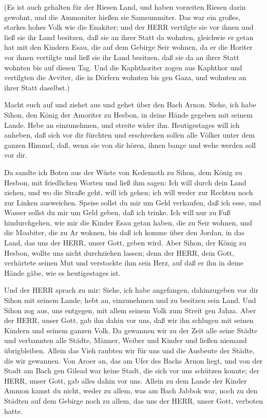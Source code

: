  (Es ist auch gehalten für der Riesen Land, und haben
vorzeiten Riesen darin gewohnt, und die Ammoniter hießen sie
Samsummiter.  Das war ein großes, starkes hohes Volk wie
die Enakiter; und der HERR vertilgte sie vor ihnen und ließ sie ihr Land
besitzen, daß sie an ihrer Statt da wohnten,  gleichwie er
getan hat mit den Kindern Esau, die auf dem Gebirge Seir wohnen, da er
die Horiter vor ihnen vertilgte und ließ sie ihr Land besitzen, daß sie
da an ihrer Statt wohnten bis auf diesen Tag.  Und die
Kaphthoriter zogen aus Kaphthor und vertilgten die Avviter, die in
Dörfern wohnten bis gen Gaza, und wohnten an ihrer Statt daselbst.)

 Macht euch auf und ziehet aus und gehet über den Bach
Arnon. Siehe, ich habe Sihon, den König der Amoriter zu Hesbon, in deine
Hände gegeben mit seinem Lande. Hebe an einzunehmen, und streite wider
ihn.  Heutigestages will ich anheben, daß sich vor dir
fürchten und erschrecken sollen alle Völker unter dem ganzen Himmel,
daß, wenn sie von dir hören, ihnen bange und wehe werden soll vor dir.

 Da sandte ich Boten aus der Wüste von Kedemoth zu Sihon,
dem König zu Hesbon, mit friedlichen Worten und ließ ihm sagen:
 Ich will durch dein Land ziehen, und wo die Straße geht,
will ich gehen; ich will weder zur Rechten noch zur Linken ausweichen.
 Speise sollst du mir um Geld verkaufen, daß ich esse, und
Wasser sollst du mir um Geld geben, daß ich trinke. Ich will nur zu Fuß
hindurchgehen,  wie mir die Kinder Esau getan haben, die zu
Seir wohnen, und die Moabiter, die zu Ar wohnen, bis daß ich komme über
den Jordan, in das Land, das uns der HERR, unser Gott, geben wird.
 Aber Sihon, der König zu Hesbon, wollte uns nicht
durchziehen lassen; denn der HERR, dein Gott, verhärtete seinen Mut und
verstockte ihm sein Herz, auf daß er ihn in deine Hände gäbe, wie es
heutigestages ist.

 Und der HERR sprach zu mir: Siehe, ich habe angefangen,
dahinzugeben vor dir Sihon mit seinem Lande; hebt an, einzunehmen und zu
besitzen sein Land.  Und Sihon zog aus, uns entgegen, mit
allem seinem Volk zum Streit gen Jahza.  Aber der HERR,
unser Gott, gab ihn dahin vor uns, daß wir ihn schlugen mit seinen
Kindern und seinem ganzen Volk.  Da gewannen wir zu der
Zeit alle seine Städte und verbannten alle Städte, Männer, Weiber und
Kinder und ließen niemand übrigbleiben.  Allein das Vieh
raubten wir für uns und die Ausbeute der Städte, die wir gewannen.
 Von Aroer an, das am Ufer des Bachs Arnon liegt, und von
der Stadt am Bach gen Gilead war keine Stadt, die sich vor uns schützen
konnte; der HERR, unser Gott, gab alles dahin vor uns. 
Allein zu dem Lande der Kinder Ammon kamst du nicht, weder zu allem, was
am Bach Jabbok war, noch zu den Städten auf dem Gebirge noch zu allem,
das uns der HERR, unser Gott, verboten hatte.

